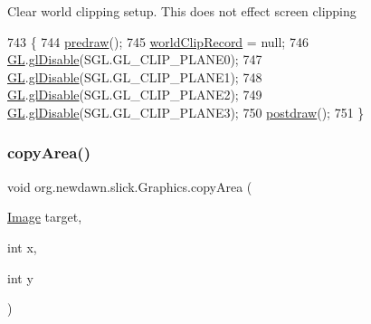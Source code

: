 Clear world clipping setup. This does not effect screen clipping 
\begin{DoxyCode}
743                                  \{
744         \mbox{\hyperlink{classorg_1_1newdawn_1_1slick_1_1_graphics_a7b4c203181e3b6302d51ed9b24596b8d}{predraw}}();
745         \mbox{\hyperlink{classorg_1_1newdawn_1_1slick_1_1_graphics_a3f8e29a8ea45df15fdd48d536fe7cb4d}{worldClipRecord}} = null;
746         \mbox{\hyperlink{classorg_1_1newdawn_1_1slick_1_1_graphics_a39ca68db81b225982a4421c4a6835eed}{GL}}.\mbox{\hyperlink{interfaceorg_1_1newdawn_1_1slick_1_1opengl_1_1renderer_1_1_s_g_l_a3b47b402f84bc1404e6b218264981bb5}{glDisable}}(SGL.GL\_CLIP\_PLANE0);
747         \mbox{\hyperlink{classorg_1_1newdawn_1_1slick_1_1_graphics_a39ca68db81b225982a4421c4a6835eed}{GL}}.\mbox{\hyperlink{interfaceorg_1_1newdawn_1_1slick_1_1opengl_1_1renderer_1_1_s_g_l_a3b47b402f84bc1404e6b218264981bb5}{glDisable}}(SGL.GL\_CLIP\_PLANE1);
748         \mbox{\hyperlink{classorg_1_1newdawn_1_1slick_1_1_graphics_a39ca68db81b225982a4421c4a6835eed}{GL}}.\mbox{\hyperlink{interfaceorg_1_1newdawn_1_1slick_1_1opengl_1_1renderer_1_1_s_g_l_a3b47b402f84bc1404e6b218264981bb5}{glDisable}}(SGL.GL\_CLIP\_PLANE2);
749         \mbox{\hyperlink{classorg_1_1newdawn_1_1slick_1_1_graphics_a39ca68db81b225982a4421c4a6835eed}{GL}}.\mbox{\hyperlink{interfaceorg_1_1newdawn_1_1slick_1_1opengl_1_1renderer_1_1_s_g_l_a3b47b402f84bc1404e6b218264981bb5}{glDisable}}(SGL.GL\_CLIP\_PLANE3);
750         \mbox{\hyperlink{classorg_1_1newdawn_1_1slick_1_1_graphics_abe054371d1486618ff327bbbcf02ff97}{postdraw}}();
751     \}
\end{DoxyCode}
\mbox{\label{classorg_1_1newdawn_1_1slick_1_1_graphics_adaf19c5b7ba46f3d31243939c8f995a6}} 
\subsubsection{\texorpdfstring{copy\+Area()}{copyArea()}}
{\footnotesize\ttfamily void org.\+newdawn.\+slick.\+Graphics.\+copy\+Area (\begin{DoxyParamCaption}\item[{\mbox{\hyperlink{classorg_1_1newdawn_1_1slick_1_1_image}{Image}}}]{target,  }\item[{int}]{x,  }\item[{int}]{y }\end{DoxyParamCaption})\hspace{0.3cm}{\ttfamily [inline]}}

